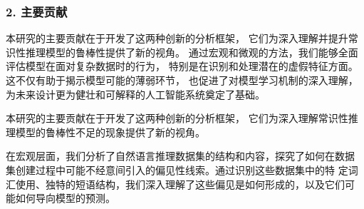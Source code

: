 

%
%

\subsubsection*{2. 主要贡献}

本研究的主要贡献在于开发了这两种创新的分析框架，
它们为深入理解并提升常识性推理模型的鲁棒性提供了新的视角。
通过宏观和微观的方法，我们能够全面评估模型在面对复杂数据时的行为，
特别是在识别和处理潜在的虚假特征方面。这不仅有助于揭示模型可能的薄弱环节，
也促进了对模型学习机制的深入理解，为未来设计更为健壮和可解释的人工智能系统奠定了基础。

本研究的主要贡献在于开发了这两种创新的分析框架，
它们为深入理解常识性推理模型的鲁棒性不足的现象提供了新的视角。

在宏观层面，我们分析了自然语言推理数据集的结构和内容，探究了如何在数据
集创建过程中可能不经意间引入的偏见性线索。通过识别这些数据集中的特
定词汇使用、独特的短语结构，我们深入理解了这些偏见是如何形成的，以及它们可
能如何导向模型的预测。

